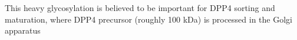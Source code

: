 This heavy glycosylation is believed to be important for DPP4 sorting and maturation, where DPP4 precursor (roughly 100 kDa) is processed in the Golgi apparatus \cite{Matter_1991}